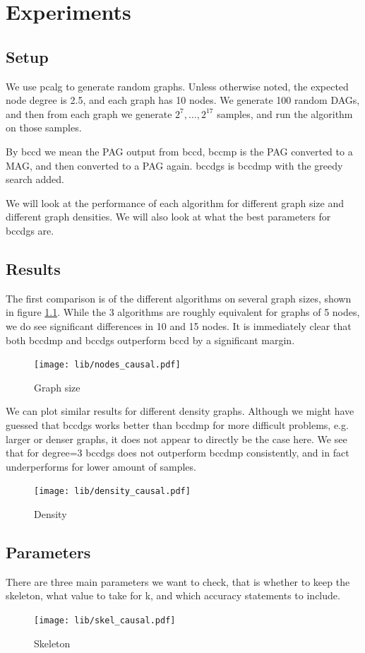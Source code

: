 \documentclass[11pt,a4paper]{report}
\begin{document}
\chapter{Experiments}\label{results}

\section{Setup}
We use pcalg to generate random graphs. Unless otherwise noted, the
expected node degree is 2.5, and each graph has 10 nodes. We generate 100
random DAGs, and then from each graph we generate $2^7, \ldots, 2^{17}$
samples, and run the algorithm on those samples.

By bccd we mean the PAG output from bccd, bccmp is the PAG converted to a
MAG, and then converted to a PAG again. bccdgs is bccdmp with the greedy
search added.

We will look at the performance of each algorithm for different graph
size and different graph densities. We will also look at what the best
parameters for bccdgs are.

\section{Results}
The first comparison is of the different algorithms on several graph
sizes, shown in figure \ref{fig:nodes_causal}. While the 3 algorithms are
roughly equivalent for graphs of 5 nodes, we do see significant
differences in 10 and 15 nodes. It is immediately clear that both bccdmp
and bccdgs outperform bccd by a significant margin.
\begin{figure}
  \centering
  \texttt{[image: lib/nodes\_causal.pdf]}
  \caption{Graph size}
  \label{fig:nodes_causal}
\end{figure}

We can plot similar results for different density graphs. Although we
might have guessed that bccdgs works better than bccdmp for more difficult
problems, e.g. larger or denser graphs, it does not appear to directly be
the case here. We see that for degree=3 bccdgs does not outperform bccdmp
consistently, and in fact underperforms for lower amount of samples.
\begin{figure}
  \centering
  \texttt{[image: lib/density\_causal.pdf]}
  \caption{Density}
  \label{fig:density_causal}
\end{figure}

\section{Parameters}
There are three main parameters we want to check, that is whether to keep
the skeleton, what value to take for k, and which accuracy statements to
include.
\begin{figure}
  \centering
  \texttt{[image: lib/skel\_causal.pdf]}
  \caption{Skeleton}
  \label{fig:skel_causal}
\end{figure}
\end{document}
